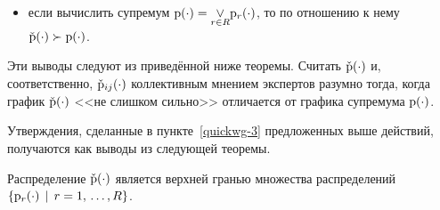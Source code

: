 \begin{enumerate}
\begin{itemize}
	    \item если вычислить супремум $\p(\cdot) = \underset{r \in R} {\mathlarger \vee}  \p_r(\cdot)$, то по отношению к нему $\check{{\mathrm{p}}}(\cdot) \succ {\mathrm{p}}(\cdot)$.  
	\end{itemize}
	Эти выводы следуют из приведённой ниже теоремы. %
	Считать $\check{{\mathrm{p}}}(\cdot)$ и, соответственно, $\check{{\mathrm{p}}}_{ij}(\cdot)$ коллективным мнением экспертов разумно тогда, когда график $\check{{\mathrm{p}}}(\cdot)$ <<не слишком сильно>> отличается от графика супремума ${\mathrm{p}}(\cdot)$.
\end{enumerate}	

Утверждения, сделанные в пункте~\ref{quickwg-3} предложенных выше действий, получаются как выводы из следующей теоремы.
\begin{theorem}
\label{theorem_zubjuk_borisov}
Распределение $\check{{\mathrm{p}}}(\cdot)$ является верхней гранью множества распределений $\{{\mathrm{p}}_r(\cdot) \,\mid\, r = 1,\, \ldots, R \}$.
\end{theorem}

